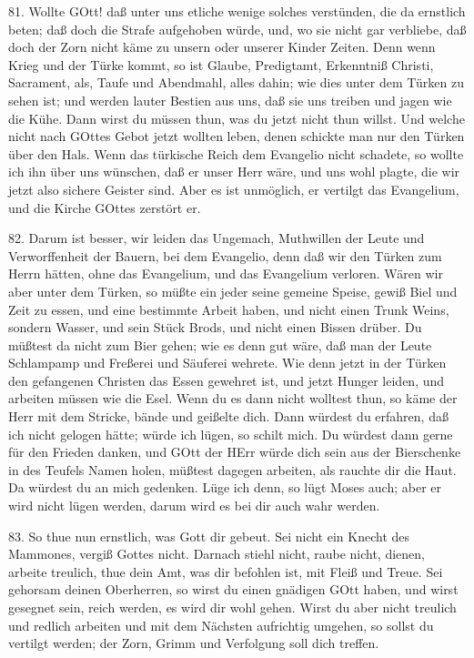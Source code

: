 81. Wollte GOtt! daß unter uns etliche wenige solches verstünden, die da ernstlich beten; daß doch die Strafe aufgehoben würde, und, wo sie nicht gar verbliebe, daß doch der Zorn nicht käme zu unsern oder unserer Kinder Zeiten. Denn wenn Krieg und der Türke kommt, so ist Glaube, Predigtamt, Erkenntniß Christi, Sacrament, als, Taufe und Abendmahl, alles dahin; wie dies unter dem Türken zu sehen ist; und werden lauter Bestien aus uns, daß sie uns treiben und jagen wie die Kühe. Dann wirst du müssen thun, was du jetzt nicht thun willst. Und welche nicht nach GOttes Gebot jetzt wollten leben, denen schickte man nur den Türken über den Hals. Wenn das türkische Reich dem Evangelio nicht schadete, so wollte ich ihn über uns wünschen, daß er unser Herr wäre, und uns wohl plagte, die wir jetzt also sichere Geister sind. Aber es ist unmöglich, er vertilgt das Evangelium, und die Kirche GOttes zerstört er.

82. Darum ist besser, wir leiden das Ungemach, Muthwillen der Leute und Verworffenheit der Bauern, bei dem Evangelio, denn daß wir den Türken zum Herrn hätten, ohne das Evangelium, und das Evangelium verloren. Wären wir aber unter dem Türken, so müßte ein jeder seine gemeine Speise, gewiß Biel und Zeit zu essen, und eine bestimmte Arbeit haben, und nicht einen Trunk Weins, sondern Wasser, und sein Stück Brods, und nicht einen Bissen drüber. Du müßtest da nicht zum Bier gehen; wie es denn gut wäre, daß man der Leute Schlampamp und Freßerei und Säuferei wehrete. Wie denn jetzt in der Türken den gefangenen Christen das Essen gewehret ist, und jetzt Hunger leiden, und arbeiten müssen wie die Esel. Wenn du es dann nicht wolltest thun, so käme der Herr mit dem Stricke, bände und geißelte dich. Dann würdest du erfahren, daß ich nicht gelogen hätte; würde ich lügen, so schilt mich. Du würdest dann gerne für den Frieden danken, und GOtt der HErr würde dich sein aus der Bierschenke in des Teufels Namen holen, müßtest dagegen arbeiten, als rauchte dir die Haut. Da würdest du an mich gedenken. Lüge ich denn, so lügt Moses auch; aber er wird nicht lügen werden, darum wird es bei dir auch wahr werden.

83. So thue nun ernstlich, was Gott dir gebeut. Sei nicht ein Knecht des Mammones, vergiß Gottes nicht. Darnach stiehl nicht, raube
nicht, dienen, arbeite treulich, thue dein Amt, was dir befohlen ist, mit Fleiß und Treue. Sei gehorsam deinen Oberherren, so wirst du einen gnädigen GOtt haben, und wirst gesegnet sein, reich werden, es wird dir wohl gehen. Wirst du aber nicht treulich und redlich arbeiten und mit dem Nächsten aufrichtig umgehen, so sollst du vertilgt werden; der Zorn, Grimm und Verfolgung soll dich treffen.

